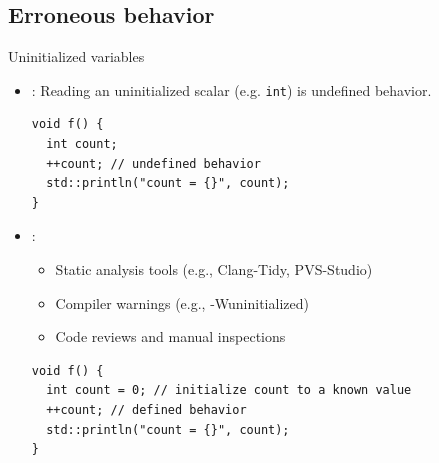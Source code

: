 \subsection{Erroneous behavior}

\begin{frame}[t,fragile]{Uninitialized variables}
	\begin{itemize}
		\item {}: Reading an uninitialized scalar (e.g. \texttt{int}) is undefined behavior.
		      \begin{lstlisting}
void f() {
  int count;
  ++count; // undefined behavior
  std::println("count = {}", count);
}
\end{lstlisting}

		\item {}:
		      \begin{itemize}
			      \item Static analysis tools (e.g., Clang-Tidy, PVS-Studio)
			      \item Compiler warnings (e.g., -Wuninitialized)
			      \item Code reviews and manual inspections
		      \end{itemize}
		      \begin{lstlisting}
void f() {
  int count = 0; // initialize count to a known value
  ++count; // defined behavior
  std::println("count = {}", count);
}
\end{lstlisting}
	\end{itemize}
\end{frame}

